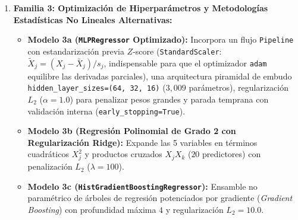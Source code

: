 \documentclass[11pt,letterpaper]{article}
\begin{document}
\begin{enumerate}
    \item \textbf{Familia 3: Optimización de Hiperparámetros y Metodologías Estadísticas No Lineales Alternativas:}
    \begin{itemize}
        \item \textbf{Modelo 3a (\texttt{MLPRegressor} Optimizado):} Incorpora un flujo \texttt{Pipeline} con estandarización previa $Z$-score (\texttt{StandardScaler}: $\tilde{X}_j = (X_j - \bar{X}_j)/s_j$, indispensable para que el optimizador \texttt{adam} equilibre las derivadas parciales), una arquitectura piramidal de embudo \texttt{hidden\_layer\_sizes=(64, 32, 16)} ($3,009$ parámetros), regularización $L_2$ ($\alpha = 1.0$) para penalizar pesos grandes y parada temprana con validación interna (\texttt{early\_stopping=True}).
        \item \textbf{Modelo 3b (Regresión Polinomial de Grado 2 con Regularización Ridge):} Expande las 5 variables en términos cuadráticos $X_j^2$ y productos cruzados $X_j X_k$ ($20$ predictores) con penalización $L_2$ ($\lambda = 100$).
        \item \textbf{Modelo 3c (\texttt{HistGradientBoostingRegressor}):} Ensamble no paramétrico de árboles de regresión potenciados por gradiente (\textit{Gradient Boosting}) con profundidad máxima $4$ y regularización $L_2 = 10.0$.
    \end{itemize}
\end{enumerate}
\end{document}
